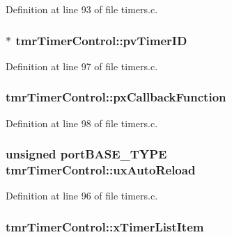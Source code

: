 Definition at line 93 of file timers.\-c.

\hypertarget{structtmr_timer_control_afcfdeb1b4882baa66161acb0e621fa9f}{
\subsubsection[{pv\-Timer\-I\-D}]{ $\ast$ tmr\-Timer\-Control\-::pv\-Timer\-I\-D}}\label{structtmr_timer_control_afcfdeb1b4882baa66161acb0e621fa9f}


Definition at line 97 of file timers.\-c.

\hypertarget{structtmr_timer_control_a5500d53ad21f73300fa98f2b7888f9c2}{
\subsubsection[{px\-Callback\-Function}]{ tmr\-Timer\-Control\-::px\-Callback\-Function}}\label{structtmr_timer_control_a5500d53ad21f73300fa98f2b7888f9c2}


Definition at line 98 of file timers.\-c.

\hypertarget{structtmr_timer_control_ae7e4e711ab55dd9a50e87ddfaafc93dd}{
\subsubsection[{ux\-Auto\-Reload}]{\setlength{\rightskip}{0pt plus 5cm}unsigned port\-B\-A\-S\-E\-\_\-\-T\-Y\-P\-E tmr\-Timer\-Control\-::ux\-Auto\-Reload}}\label{structtmr_timer_control_ae7e4e711ab55dd9a50e87ddfaafc93dd}


Definition at line 96 of file timers.\-c.

\hypertarget{structtmr_timer_control_aef6cf82358f42f3e823a261514177364}{
\subsubsection[{x\-Timer\-List\-Item}]{ tmr\-Timer\-Control\-::x\-Timer\-List\-Item}}\label{structtmr_timer_control_aef6cf82358f42f3e823a261514177364}


